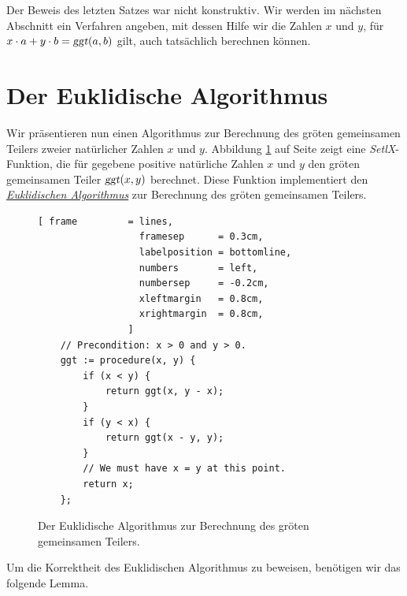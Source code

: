 \remark
Der Beweis des letzten Satzes war nicht konstruktiv.  Wir werden im n\"{a}chsten Abschnitt ein
Verfahren angeben, mit dessen Hilfe wir die Zahlen $x$ und $y$, f\"{u}r 
$x \cdot a + y \cdot b = \textsl{ggt}(a, b)$ gilt, auch tats\"{a}chlich berechnen k\"{o}nnen.


\section{Der Euklidische Algorithmus}
Wir pr\"{a}sentieren nun einen Algorithmus zur Berechnung des gr\"{o}\3ten gemeinsamen 
Teilers zweier nat\"{u}rlicher Zahlen $x$ und $y$.
 Abbildung \ref{fig:ggt.stlx} auf Seite \pageref{fig:ggt.stlx} zeigt eine
\textsl{SetlX}-Funktion, die f\"{u}r gegebene positive nat\"{u}rliche Zahlen $x$ und $y$ den gr\"{o}\3ten gemeinsamen  Teiler 
$\textsl{ggt}(x,y)$ berechnet.  Diese Funktion implementiert den 
\href{https://en.wikipedia.org/wiki/Euclidean_algorithm}{\emph{Euklidischen Algorithmus}} zur
Berechnung des gr\"{o}\3ten gemeinsamen Teilers. 


\begin{figure}[!ht]
\centering
\begin{Verbatim}[ frame         = lines, 
                  framesep      = 0.3cm, 
                  labelposition = bottomline,
                  numbers       = left,
                  numbersep     = -0.2cm,
                  xleftmargin   = 0.8cm,
                  xrightmargin  = 0.8cm,
                ]
    // Precondition: x > 0 and y > 0.
    ggt := procedure(x, y) {
        if (x < y) {
            return ggt(x, y - x);
        }
        if (y < x) {
            return ggt(x - y, y); 
        }
        // We must have x = y at this point.
        return x;
    };
\end{Verbatim}  
\vspace*{-0.3cm}
\caption{Der Euklidische Algorithmus zur Berechnung des gr\"{o}\3ten gemeinsamen Teilers.}
\label{fig:ggt.stlx}
\end{figure} %

Um die Korrektheit des Euklidischen Algorithmus zu beweisen, ben\"{o}tigen wir das folgende Lemma.

